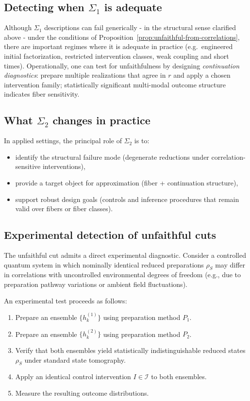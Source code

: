 \subsection{Detecting when \texorpdfstring{$\Sigma_1$}{Sigma-1} is adequate}
\label{sec:detect}

Although $\Sigma_1$ descriptions can fail generically - in the structural sense clarified above - under the conditions of Proposition~\ref{prop:unfaithful-from-correlations}, there are important regimes where it is adequate in
practice (e.g.\ engineered initial factorization, restricted intervention classes, weak coupling
and short times). Operationally, one can test for unfaithfulness by designing \emph{continuation
diagnostics}: prepare multiple realizations that agree in $r$ and apply a chosen intervention
family; statistically significant multi-modal outcome structure indicates fiber sensitivity.

\subsection{What \texorpdfstring{$\Sigma_2$}{Sigma-2} changes in practice}
\label{sec:practical-summary}

In applied settings, the principal role of $\Sigma_2$ is to:
\begin{itemize}
  \item identify the structural failure mode (degenerate reductions under correlation-sensitive
        interventions),
  \item provide a target object for approximation (fiber + continuation structure),
  \item support robust design goals (controls and inference procedures that remain valid over
        fibers or fiber classes).
\end{itemize}

\subsection{Experimental detection of unfaithful cuts}
\label{sec:experimental-unfaithful}

The unfaithful cut admits a direct experimental diagnostic. Consider a controlled quantum
system in which nominally identical reduced preparations $\rho_S$ may differ in correlations
with uncontrolled environmental degrees of freedom (e.g., due to preparation pathway
variations or ambient field fluctuations).

An experimental test proceeds as follows:
\begin{enumerate}
  \item Prepare an ensemble $\{h^{(1)}_k\}$ using preparation method $P_1$.
  \item Prepare an ensemble $\{h^{(2)}_k\}$ using preparation method $P_2$.
  \item Verify that both ensembles yield statistically indistinguishable reduced states
        $\rho_S$ under standard state tomography.
  \item Apply an identical control intervention $I \in \mathcal{I}$ to both ensembles.
  \item Measure the resulting outcome distributions.
\end{enumerate}

